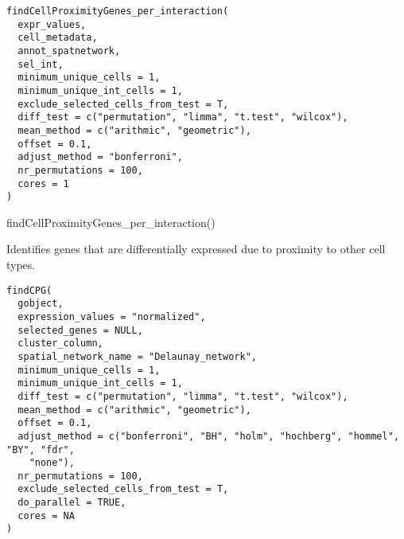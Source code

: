 \documentclass[a4paper]{book}
\begin{document}
%
\begin{Usage}
\begin{verbatim}
findCellProximityGenes_per_interaction(
  expr_values,
  cell_metadata,
  annot_spatnetwork,
  sel_int,
  minimum_unique_cells = 1,
  minimum_unique_int_cells = 1,
  exclude_selected_cells_from_test = T,
  diff_test = c("permutation", "limma", "t.test", "wilcox"),
  mean_method = c("arithmic", "geometric"),
  offset = 0.1,
  adjust_method = "bonferroni",
  nr_permutations = 100,
  cores = 1
)
\end{verbatim}
\end{Usage}
%
\begin{Examples}
\begin{ExampleCode}
    findCellProximityGenes_per_interaction()
\end{ExampleCode}
\end{Examples}
%
\begin{Description}\relax
Identifies genes that are differentially expressed due to proximity to other cell types.
\end{Description}
%
\begin{Usage}
\begin{verbatim}
findCPG(
  gobject,
  expression_values = "normalized",
  selected_genes = NULL,
  cluster_column,
  spatial_network_name = "Delaunay_network",
  minimum_unique_cells = 1,
  minimum_unique_int_cells = 1,
  diff_test = c("permutation", "limma", "t.test", "wilcox"),
  mean_method = c("arithmic", "geometric"),
  offset = 0.1,
  adjust_method = c("bonferroni", "BH", "holm", "hochberg", "hommel", "BY", "fdr",
    "none"),
  nr_permutations = 100,
  exclude_selected_cells_from_test = T,
  do_parallel = TRUE,
  cores = NA
)
\end{verbatim}
\end{Usage}
%
\end{document}
